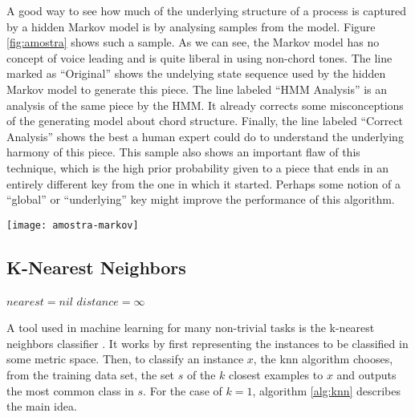A good way to see how much of the underlying structure of a process is
captured by a hidden Markov model is by analysing samples from the
model. Figure \ref{fig:amostra} shows such a sample. As we can see,
the Markov model has no concept of voice leading and is quite liberal
in using non-chord tones. The line marked as ``Original'' shows the
undelying state sequence used by the hidden Markov model to generate
this piece. The line labeled ``HMM Analysis'' is an analysis of the
same piece by the HMM. It already corrects some misconceptions of the
generating model about chord structure. Finally, the line labeled
``Correct Analysis'' shows the best a human expert could do to
understand the underlying harmony of this piece. This sample also
shows an important flaw of this technique, which is the high prior
probability given to a piece that ends in an entirely different key
from the one in which it started. Perhaps some notion of a ``global''
or ``underlying'' key might improve the performance of this algorithm.

\begin{figure*}[t]
  \centering
  \texttt{[image: amostra-markov]}
  \caption{A sample from the hidden Markov model}
  \label{fig:amostra}
\end{figure*}

\subsection{K-Nearest Neighbors}
\label{sec:knn}

\begin{algorithm}[t]
  \SetLine
  $nearest = nil$\;
  $distance = \infty$\;
  \;
  \caption{A nearest neighbor classifier (a knn for $k=1$).}
  \label{alg:knn}
\end{algorithm}

A tool used in machine learning for many non-trivial tasks is the
k-nearest neighbors classifier \cite{mitchell97:machine}. It works by
first representing the instances to be classified in some metric
space. Then, to classify an instance $x$, the knn algorithm chooses,
from the training data set, the set $s$ of the $k$ closest examples to
$x$ and outputs the most common class in $s$. For the case of $k=1$,
algorithm \ref{alg:knn} describes the main idea.


